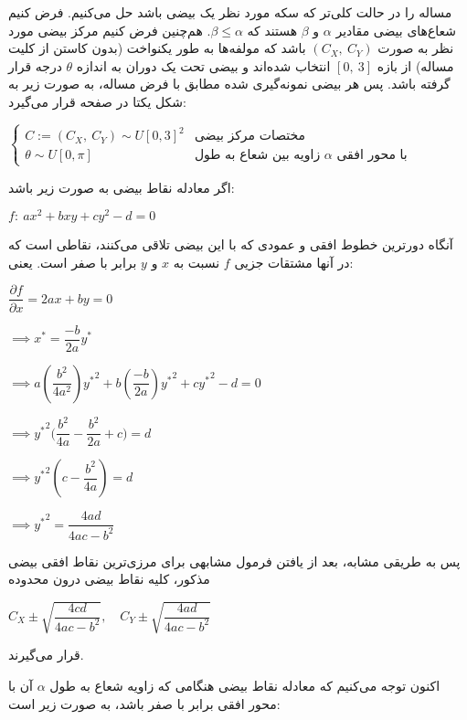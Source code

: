 \documentclass{scribe-cgenomics}
\begin{document}
\begin{حل}

مساله را در حالت کلی‌تر که سکه مورد نظر یک بیضی باشد حل می‌کنیم. فرض کنیم شعاع‌های بیضی مقادیر
$\alpha$
و
$\beta$
هستند که
$\beta \leq \alpha$.
هم‌چنین فرض کنیم مرکز بیضی مورد نظر به صورت
$(C_X,\ C_Y)$
باشد که مولفه‌ها به طور یکنواخت (بدون کاستن از کلیت مساله) از بازه
$[0,\ 3]$
انتخاب شده‌اند و بیضی تحت یک دوران به اندازه
$\theta$
درجه قرار گرفته باشد. پس هر بیضی نمونه‌گیری شده مطابق با فرض مساله، به صورت زیر به شکل یکتا در صفحه قرار می‌گیرد:

\begin{center}
$
\begin{cases}
C := (C_X,\ C_Y) \sim U[0, 3]^2 & \text{مختصات مرکز بیضی} \\
\theta \sim U[0,\pi] & \text{زاویه بین شعاع به طول $\alpha$ با محور افقی} 
\end{cases}
$
\end{center}

اگر معادله نقاط بیضی به صورت زیر باشد:

\begin{center}
$
f:\ ax^2 + bxy + cy^2 -d = 0
$
\end{center}

آنگاه دورترین خطوط افقی و عمودی که با این بیضی تلاقی می‌کنند، نقاطی است که در آنها مشتقات جزیی
$f$
نسبت به
$x$
و
$y$
برابر با صفر است. یعنی:

\begin{center}
$
\dfrac{\partial f}{\partial x} = 2ax + by = 0 
$

$
\implies x^* = \dfrac{-b}{2a}y^*
$

$
\implies a(\dfrac{b^2}{4a^2}){y^*}^2 + b(\dfrac{-b}{2a}){y^*}^2 + c{y^*}^2 - d = 0
$

$
\implies {y^*}^2 \big( \dfrac{b^2}{4a} - \dfrac{b^2}{2a} + c \big) = d
$

$
\implies {y^*}^2 (c - \dfrac{b^2}{4a}) = d
$

$
\implies {y^*}^2 = \dfrac{4ad}{4ac - b^2}
$
\end{center}

پس به طریقی مشابه، بعد از یافتن فرمول مشابهی برای مرزی‌ترین نقاط افقی بیضی مذکور، کلیه نقاط بیضی درون محدوده

\begin{center}
$
C_X \pm \sqrt{\dfrac{4cd}{4ac-b^2}}, \quad
C_Y \pm \sqrt{\dfrac{4ad}{4ac-b^2}}
$
\end{center}

قرار می‌گیرند.

اکنون توجه می‌کنیم که معادله نقاط بیضی هنگامی که زاویه شعاع به طول
$\alpha$
آن با محور افقی برابر با صفر باشد، به صورت زیر است:


\end{حل}
\end{document}
